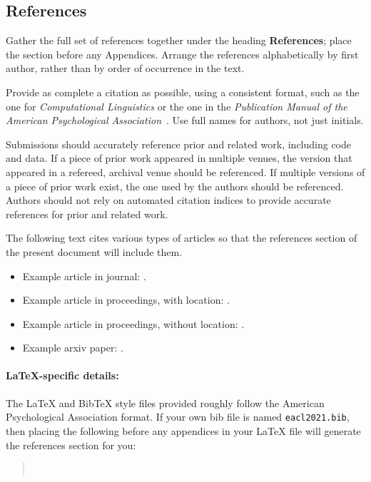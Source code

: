 \documentclass[11pt,a4paper]{article}
\begin{document}
\subsection{References}
Gather the full set of references together under the heading \textbf{References}; place the section before any Appendices. 
Arrange the references alphabetically by first author, rather than by order of occurrence in the text.

Provide as complete a citation as possible, using a consistent format, such as the one for \emph{Computational Linguistics\/} or the one in the  \emph{Publication Manual of the American 
Psychological Association\/}~\citep{APA:83}.
Use full names for authors, not just initials.

Submissions should accurately reference prior and related work, including code and data.
If a piece of prior work appeared in multiple venues, the version that appeared in a refereed, archival venue should be referenced.
If multiple versions of a piece of prior work exist, the one used by the authors should be referenced.
Authors should not rely on automated citation indices to provide accurate references for prior and related work.

The following text cites various types of articles so that the references section of the present document will include them.
\begin{itemize}
\item Example article in journal: \citep{Ando2005}.
\item Example article in proceedings, with location: \citep{borschinger-johnson-2011-particle}.
\item Example article in proceedings, without location: \citep{andrew2007scalable}.
\item Example arxiv paper: \citep{rasooli-tetrault-2015}. 
\end{itemize}


\paragraph{\LaTeX-specific details:}
The \LaTeX{} and Bib\TeX{} style files provided roughly follow the American Psychological Association format.
If your own bib file is named \texttt{\small eacl2021.bib}, then placing the following before any appendices in your \LaTeX{}  file will generate the references section for you:
\begin{quote}\small
\verb||\\
\verb||
\end{quote}
\end{document}
